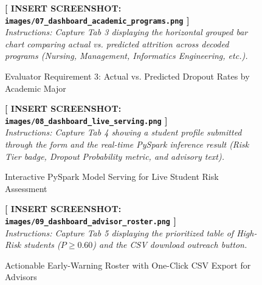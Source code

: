 \documentclass[11pt,a4paper]{article}
\begin{document}
\begin{figure}[H]
    \centering
    \begin{tcolorbox}[colback=gray!10,colframe=gray!60,title=\textbf{SCREENSHOT 7: Compulsory 3 -- Dropout Rates by Academic Program (Tab 3)}]
        \vspace{3.5cm}
        \centering
        \textbf{[ INSERT SCREENSHOT: \texttt{images/07\_dashboard\_academic\_programs.png} ]}\\[6pt]
        \textit{Instructions: Capture Tab 3 displaying the horizontal grouped bar chart comparing actual vs. predicted attrition across decoded programs (Nursing, Management, Informatics Engineering, etc.).}
        \vspace{0.5cm}
    \end{tcolorbox}
    \caption{Evaluator Requirement 3: Actual vs. Predicted Dropout Rates by Academic Major}
    \label{fig:out_tab3}
\end{figure}

\begin{figure}[H]
    \centering
    \begin{tcolorbox}[colback=gray!10,colframe=gray!60,title=\textbf{SCREENSHOT 8: Live PySpark Model Serving \& Risk Calculator (Tab 4)}]
        \vspace{3.5cm}
        \centering
        \textbf{[ INSERT SCREENSHOT: \texttt{images/08\_dashboard\_live\_serving.png} ]}\\[6pt]
        \textit{Instructions: Capture Tab 4 showing a student profile submitted through the form and the real-time PySpark inference result (Risk Tier badge, Dropout Probability metric, and advisory text).}
        \vspace{0.5cm}
    \end{tcolorbox}
    \caption{Interactive PySpark Model Serving for Live Student Risk Assessment}
    \label{fig:out_tab4}
\end{figure}

\begin{figure}[H]
    \centering
    \begin{tcolorbox}[colback=gray!10,colframe=gray!60,title=\textbf{SCREENSHOT 9: Advisor Actionable Early-Warning Roster (Tab 5)}]
        \vspace{3.5cm}
        \centering
        \textbf{[ INSERT SCREENSHOT: \texttt{images/09\_dashboard\_advisor\_roster.png} ]}\\[6pt]
        \textit{Instructions: Capture Tab 5 displaying the prioritized table of High-Risk students ($P \ge 0.60$) and the CSV download outreach button.}
        \vspace{0.5cm}
    \end{tcolorbox}
    \caption{Actionable Early-Warning Roster with One-Click CSV Export for Advisors}
    \label{fig:out_tab5}
\end{figure}
\end{document}
